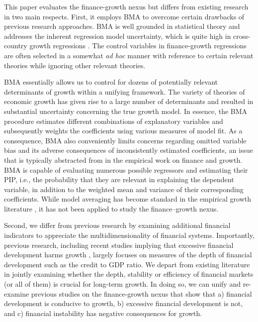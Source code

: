 \begin{refsection}
This paper evaluates the finance-growth nexus but differs from existing research in two main respects. First, it employs \ac{BMA} to overcome certain drawbacks of previous research approaches. \ac{BMA} is well grounded in statistical theory \parencite{Rafteryetal1997} and addresses the inherent regression model uncertainty, which is quite high in cross-country growth regressions \parencite{Fernandezetal2001, SalaiMartinetal2004, Durlaufetal2008}. The control variables in finance-growth regressions are often selected in a somewhat \textit{ad hoc} manner with reference to certain relevant theories while ignoring other relevant theories. 

\ac{BMA} essentially allows us to control for dozens of potentially relevant determinants of growth within a unifying framework. The variety of theories of economic growth has given rise to a large number of determinants and resulted in substantial uncertainty concerning the true growth model. In essence, the \ac{BMA} procedure estimates different combinations of explanatory variables and subsequently weights the coefficients using various measures of model fit. As a consequence, \ac{BMA} also conveniently limits concerns regarding omitted variable bias and its adverse consequences of inconsistently estimated coefficients, an issue that is typically abstracted from in the empirical work on finance and growth. \ac{BMA} is capable of evaluating numerous possible regressors and estimating their \ac{PIP}, i.e., the probability that they are relevant in explaining the dependent variable, in addition to the weighted mean and variance of their corresponding coefficients. While model averaging has become standard in the empirical growth literature \parencite{SalaiMartinetal2004, Durlaufetal2008}, it has not been applied to study the finance--growth nexus.  

Second, we differ from previous research by examining additional financial indicators to appreciate the multidimensionality of financial systems. Importantly, previous research, including recent studies implying that excessive financial development harms growth \parencite{Arcandetal2012,CecchettiKharroubi2012,LawSingh2014}, largely focuses on measures of the depth of financial development such as the credit to GDP ratio. We depart from existing literature in jointly examining whether the depth, stability or efficiency of financial markets (or all of them) is crucial for long-term growth. In doing so, we can unify and re-examine previous studies on the finance-growth nexus that show that a) financial development is conducive to growth, b) excessive financial development is not, and c) financial instability has negative consequences for growth.


\end{refsection}
